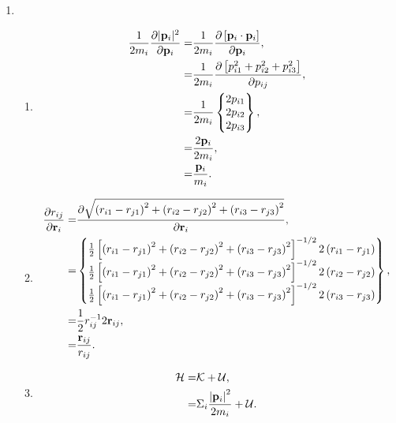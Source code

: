 \documentclass{article}
\begin{document}
\begin{enumerate}[label=\alph*)]
  \item \begin{enumerate}[label=\roman*]
      \item \begin{align*}
          \frac{1}{2m_i} \frac{\partial |\mathbf{p}_i|^2}{\partial \mathbf{p}_i} = & \frac{1}{2m_i} \frac{\partial \left[\mathbf{p}_i \cdot \mathbf{p}_i\right]}{\partial \mathbf{p}_i}, \\
          = & \frac{1}{2m_i} \frac{\partial \left[p_{i1}^2 + p_{i2}^2 + p_{i3}^2\right]}{\partial p_{ij}}, \\
        = & \frac{1}{2m_i} \begin{Bmatrix}2p_{i1} \\ 2p_{i2} \\ 2p_{i3}\end{Bmatrix}, \\
        = & \frac{2 \mathbf{p}_i}{2m_i}, \\
        = & \frac{\mathbf{p}_i}{m_i}.
        \end{align*}
      \item \begin{align*}
          \frac{\partial r_{ij}}{\partial \mathbf{r}_i} = & \frac{\partial \sqrt{\left(r_{i1} - r_{j1}\right)^2 + \left(r_{i2} - r_{j2}\right)^2 + \left(r_{i3} - r_{j3}\right)^2}}{\partial \mathbf{r}_i}, \\
        = & \begin{Bmatrix} \frac{1}{2} \left[\left(r_{i1} - r_{j1}\right)^2 + \left(r_{i2} - r_{j2}\right)^2 + \left(r_{i3} - r_{j3}\right)^2\right]^{-1/2} 2\left(r_{i1} - r_{j1}\right) \\ \frac{1}{2} \left[\left(r_{i1} - r_{j1}\right)^2 + \left(r_{i2} - r_{j2}\right)^2 + \left(r_{i3} - r_{j3}\right)^2\right]^{-1/2} 2\left(r_{i2} - r_{j2}\right) \\ \frac{1}{2} \left[\left(r_{i1} - r_{j1}\right)^2 + \left(r_{i2} - r_{j2}\right)^2 + \left(r_{i3} - r_{j3}\right)^2\right]^{-1/2} 2\left(r_{i3} - r_{j3}\right) \end{Bmatrix}, \\
          = & \frac{1}{2} r_{ij}^{-1} 2\mathbf{r}_{ij}, \\
          = & \frac{\mathbf{r}_{ij}}{r_{ij}}.
        \end{align*}
      \item 
        \begin{align*}
          \mathcal{H} = & \mathcal{K} + \mathcal{U}, \\
          = & \Sigma_i \frac{\left|\p_i\right|^2}{2 m_i} + \mathcal{U}. \\

\end{align*}
\end{enumerate}
\end{enumerate}
\end{document}
